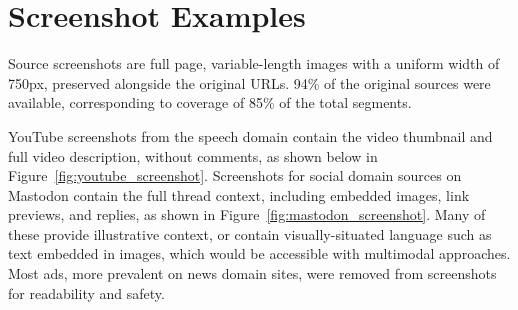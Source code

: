 \section{Screenshot Examples}
\label{appendix:screenshots}

Source screenshots are full page, variable-length images with a uniform width of 750px, preserved alongside the original URLs.
94\% of the original sources were available, corresponding to coverage of 85\% of the total segments. 

YouTube screenshots from the speech domain contain the video thumbnail and full video description, without comments, as shown below in Figure~\ref{fig:youtube_screenshot}. 
%
Screenshots for social domain sources on Mastodon contain the full  thread context, including embedded images, link previews, and replies, as shown in Figure~\ref{fig:mastodon_screenshot}. 
Many of these provide illustrative context, or contain visually-situated language such as text embedded in images, which would be accessible with multimodal approaches. 
%
Most ads, more prevalent on news domain sites, were removed from screenshots for readability and safety. 




